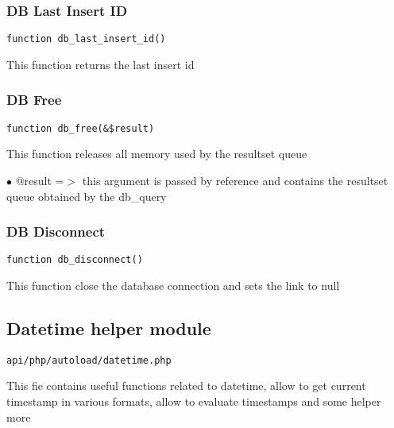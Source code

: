 \documentclass[a4paper]{article}
\begin{document}
\hypertarget{toc93}{}
\subsubsection{DB Last Insert ID}

\begin{lstlisting}
function db_last_insert_id()
\end{lstlisting}

This function returns the last insert id

\hypertarget{toc94}{}
\subsubsection{DB Free}

\begin{lstlisting}
function db_free(&$result)
\end{lstlisting}

This function releases all memory used by the resultset queue

\begin{compactitem}
\item[\color{myblue}$\bullet$] @result =$>$ this argument is passed by reference and contains the resultset queue
           obtained by the db\_query
\end{compactitem}

\hypertarget{toc95}{}
\subsubsection{DB Disconnect}

\begin{lstlisting}
function db_disconnect()
\end{lstlisting}

This function close the database connection and sets the link to null

\hypertarget{toc96}{}
\subsection{Datetime helper module}

\begin{lstlisting}
api/php/autoload/datetime.php
\end{lstlisting}

This fie contains useful functions related to datetime, allow to get current timestamp in various
formats, allow to evaluate timestamps and some helper more

\hypertarget{toc97}{}
\end{document}
